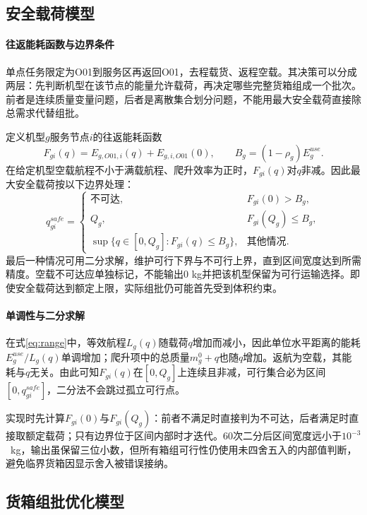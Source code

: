 \subsection{安全载荷模型}
\paragraph{往返能耗函数与边界条件}
单点任务限定为O01到服务区再返回O01，去程载货、返程空载。其决策可以分成两层：先判断机型在该节点的能量允许载荷，再决定哪些完整货箱组成一个批次。前者是连续质量变量问题，后者是离散集合划分问题，不能用最大安全载荷直接除总需求代替组批。

定义机型$g$服务节点$i$的往返能耗函数
\begin{equation}
F_{gi}(q)=E_{g,O01,i}(q)+E_{g,i,O01}(0),\qquad B_g=(1-\rho_g)E_g^{use}.
\end{equation}
在给定机型空载航程不小于满载航程、爬升效率为正时，$F_{gi}(q)$对$q$非减。因此最大安全载荷按以下边界处理：
\begin{equation}
q_{gi}^{safe}=\begin{cases}
\text{不可达},&F_{gi}(0)>B_g,\\
Q_g,&F_{gi}(Q_g)\le B_g,\\
\sup\{q\in[0,Q_g]:F_{gi}(q)\le B_g\},&\text{其他情况}.
\end{cases}\label{eq:safe-payload}
\end{equation}
最后一种情况可用二分求解，维护可行下界与不可行上界，直到区间宽度达到所需精度。空载不可达应单独标记，不能输出0 kg并把该机型保留为可行运输选择。即使安全载荷达到额定上限，实际组批仍可能首先受到体积约束。

\paragraph{单调性与二分求解}
在式\eqref{eq:range}中，等效航程$L_g(q)$随载荷$q$增加而减小，因此单位水平距离的能耗$E_g^{use}/L_g(q)$单调增加；爬升项中的总质量$m_g^0+q$也随$q$增加。返航为空载，其能耗与$q$无关。由此可知$F_{gi}(q)$在$[0,Q_g]$上连续且非减，可行集合必为区间$[0,q_{gi}^{safe}]$，二分法不会跳过孤立可行点。

实现时先计算$F_{gi}(0)$与$F_{gi}(Q_g)$：前者不满足时直接判为不可达，后者满足时直接取额定载荷；只有边界位于区间内部时才迭代。60次二分后区间宽度远小于$10^{-3}$~kg，输出虽保留三位小数，但所有箱组可行性仍使用未四舍五入的内部值判断，避免临界货箱因显示舍入被错误接纳。

\subsection{货箱组批优化模型}
